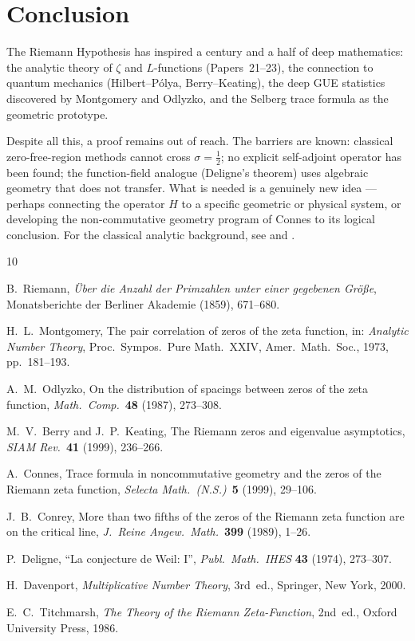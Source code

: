\documentclass[12pt,a4paper]{amsart}
\theoremstyle{definition}
\begin{document}
\section{Conclusion}

The Riemann Hypothesis has inspired a century and a half of deep mathematics:
the analytic theory of $\zeta$ and $L$-functions (Papers~21--23), the
connection to quantum mechanics (Hilbert--P\'olya, Berry--Keating), the
deep GUE statistics discovered by Montgomery and Odlyzko, and the Selberg
trace formula as the geometric prototype.

Despite all this, a proof remains out of reach.  The barriers are known:
classical zero-free-region methods cannot cross $\sigma = \tfrac{1}{2}$;
no explicit self-adjoint operator has been found; the function-field
analogue (Deligne's theorem) uses algebraic geometry that does not
transfer.  What is needed is a genuinely new idea ---
perhaps connecting the operator $H$ to a specific geometric or
physical system, or developing the non-commutative geometry program
of Connes to its logical conclusion.
For the classical analytic background, see \cite{Davenport2000} and \cite{Titchmarsh1986}.

\begin{thebibliography}{10}

B.~Riemann,
\emph{\"Uber die Anzahl der Primzahlen unter einer gegebenen Gr\"o\ss e},
Monatsberichte der Berliner Akademie (1859), 671--680.

H.~L.~Montgomery,
The pair correlation of zeros of the zeta function,
in: \emph{Analytic Number Theory}, Proc.\ Sympos.\ Pure Math.~XXIV,
Amer.\ Math.\ Soc., 1973, pp.~181--193.

A.~M.~Odlyzko,
On the distribution of spacings between zeros of the zeta function,
\emph{Math.\ Comp.}\ \textbf{48} (1987), 273--308.

M.~V.~Berry and J.~P.~Keating,
The Riemann zeros and eigenvalue asymptotics,
\emph{SIAM Rev.}\ \textbf{41} (1999), 236--266.

A.~Connes,
Trace formula in noncommutative geometry and the zeros of the Riemann
zeta function,
\emph{Selecta Math.\ (N.S.)}\ \textbf{5} (1999), 29--106.

J.~B.~Conrey,
More than two fifths of the zeros of the Riemann zeta function are on
the critical line,
\emph{J.\ Reine Angew.\ Math.}\ \textbf{399} (1989), 1--26.

P.~Deligne, ``La conjecture de Weil: I'', \textit{Publ.\ Math.\ IHES} \textbf{43} (1974), 273--307.

H.~Davenport,
\emph{Multiplicative Number Theory}, 3rd~ed.,
Springer, New York, 2000.

E.~C.~Titchmarsh,
\emph{The Theory of the Riemann Zeta-Function}, 2nd~ed.,
Oxford University Press, 1986.

\end{thebibliography}
\end{document}
